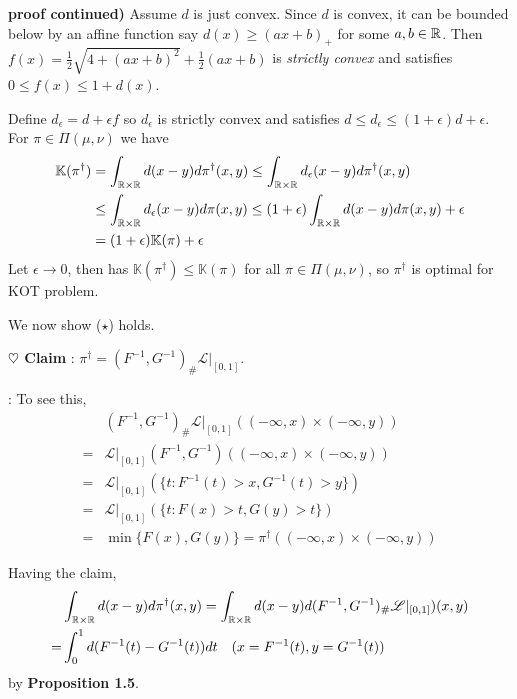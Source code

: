 \documentclass[12pt,a4paper]{article}
\newenvironment{proof}
{\begin{changemargin}{1cm}{0.5cm} 
	}%
	{\end{changemargin}
}
\newenvironment{subproof}
{\begin{changemargin}{0.5cm}{0.5cm} 
	}%
	{\end{changemargin}
}
\newenvironment{p}
{\begin{proof} 
	}%
	{\end{proof}
}
\begin{document}
\begin{p}
\textbf{proof continued)} Assume $d$ is just convex. Since $d$ is convex, it can be bounded below by an affine function say $d(x) \geq (ax+b)_+$ for some $a, b\in \mathbb{R}$. Then $f(x) = \frac{1}{2} \sqrt{4+ (ax+b)^2} + \frac{1}{2}(ax+b)$ is \emph{strictly convex} and satisfies $0\leq f(x) \leq 1+ d(x)$.

\quad Define $d_{\epsilon} = d+ \epsilon f$ so $d_{\epsilon}$ is strictly convex and satisfies $d\leq d_{\epsilon} \leq (1+ \epsilon) d + \epsilon$. For $\pi \in \Pi(\mu, \nu)$ we have
\begin{align*}
\mathbb{K}(\pi^{\dagger}) &= \int_{\mathbb{R} \times \mathbb{R}} d(x-y) d\pi^{\dagger}(x,y) \leq \int_{\mathbb{R} \times \mathbb{R}} d_{\epsilon}(x-y) d\pi^{\dagger}(x,y) \\
&\leq \int_{\mathbb{R} \times \mathbb{R}} d_{\epsilon}(x-y) d\pi(x,y) \leq (1+ \epsilon) \int_{\mathbb{R} \times \mathbb{R}} d(x-y) d\pi(x,y) + \epsilon\\
&= (1+ \epsilon)\mathbb{K}(\pi ) +\epsilon
\end{align*}
Let $\epsilon \rightarrow 0$, then has $\mathbb{K}(\pi^{\dagger}) \leq \mathbb{K}(\pi)$ for all $\pi \in \Pi(\mu, \nu)$, so $\pi^{\dagger}$ is optimal for KOT problem.
\s

We now show ($\star$) holds.

\textbf{$\heartsuit$ Claim} : $\pi^{\dagger} = (F^{-1}, G^{-1})_{\#} \mathscr{L}|_{[0,1]}$.
\begin{subproof}
: To see this,
\begin{align*}
& (F^{-1}, G^{-1})_{\#} \mathscr{L}|_{[0,1]}((-\infty, x) \times (-\infty, y)) \\
= &\mathscr{L}|_{[0,1]} (F^{-1}, G^{-1})((-\infty, x) \times (-\infty, y)) \\
= &\mathscr{L}|_{[0,1]} (\{ t: F^{-1}(t) > x, G^{-1}(t) > y\}) \\
= &\mathscr{L}|_{[0,1]} (\{ t: F(x) > t, G(y)  > t \}) \\
= &\min\{ F(x),G(y)\} = \pi^{\dagger}((-\infty, x) \times (-\infty, y))
\end{align*}
\end{subproof}

Having the claim, 
\begin{align*}
&\int_{\mathbb{R} \times \mathbb{R}} d(x-y) d\pi^{\dagger}(x,y) = \int_{\mathbb{R} \times \mathbb{R}} d(x-y) d (F^{-1}, G^{-1})_{\#} \mathscr{L}|_{[0,1]} ) (x,y) \\
=&\int_0^1 d(F^{-1}(t) - G^{-1}(t)) dt \quad (x= F^{-1}(t), y= G^{-1}(t))
\end{align*}
by \textbf{Proposition 1.5}.  

\eop
\end{p}
\s
\end{document}
